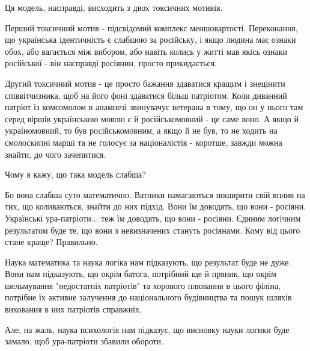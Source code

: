 Ця модель, насправді, висходить з двох токсичних мотивів.

Перший токсичний мотив - підсвідомий комплекс меншовартості. Переконання, що
українська ідентичність є слабшою за російську, і якщо людина має ознаки обох,
або вагається між вибором, або навіть колись у житті мав якісь ознаки
російської - він насправді росіянин, просто прикидається.

Другий токсичний мотив - це просто бажання здаватися кращим і знецінити
співвітчизника, щоб на його фоні здаватися більш патріотом. Коли диванний
патріот із комсомолом в анамнезі звинувачує ветерана в тому, що он у нього там
серед віршів українською мовою є й російськомовний - це саме воно. А якщо й
україномовний, то був російськомовним, а якщо й не був, то не ходить на
смолоскипні марші та не голосує за націоналістів - коротше, завжди можна
знайти, до чого зачепитися.

Чому я кажу, що така модель слабша?

Бо вона слабша суто математично. Ватники намагаються поширити свій вплив на
тих, що коливаються, знайти до них підхід. Вони їм доводять, що вони - росіяни.
Українські ура-патріоти... теж їм доводять, що вони - росіяни. Єдиним логічним
результатом буде те, що вони з невизначених стануть росіянами. Кому від цього
стане краще? Правильно.

Наука математика та наука логіка нам підказують, що результат буде не дуже.
Вони нам підказують, що окрім батога, потрібний ще й пряник, що окрім
шельмування "недостатніх патріотів" та хорового плювання в цього філіна,
потрібне їх активне залучення до національного будівництва та пошук шляхів
виховання в них патріотів справжніх.

Але, на жаль, наука психологія нам підказує, що висновку науки логики буде
замало, щоб ура-патріоти збавили обороти.

